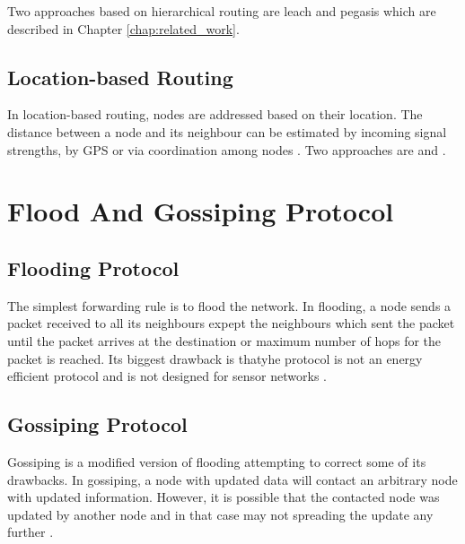 \documentclass[USenglish]{uit-thesis}
\begin{document}

Two approaches based on hierarchical routing are \gls{leach}\cite{leach} and \gls{pegasis}\cite{pegasis} which are described in Chapter \ref{chap:related_work}.


\subsection{Location-based Routing}
In location-based routing, nodes are addressed based on their location. The distance between a node and its neighbour can be estimated by incoming signal strengths, by GPS or via coordination among nodes \cite{routing_survey}. Two approaches are \cite{gaf} and \cite{gear}.


\section{Flood And Gossiping Protocol}
\subsection{Flooding Protocol}
The simplest forwarding rule is to flood the network. In flooding, a node sends a packet received to all its neighbours expept the neighbours which sent the packet until the packet arrives at the destination or maximum number of hops for the packet is reached. Its biggest drawback is thatyhe protocol is not an energy efficient protocol and is not designed for sensor networks \cite{wsnbook}.

\subsection{Gossiping Protocol}
Gossiping is a modified version of flooding attempting to correct some of its drawbacks. In gossiping, a node with updated data will contact an arbitrary node with updated information. However, it is possible that the contacted node was updated by another node and in that case may not spreading the update any further \cite{dsbook}.
\end{document}

